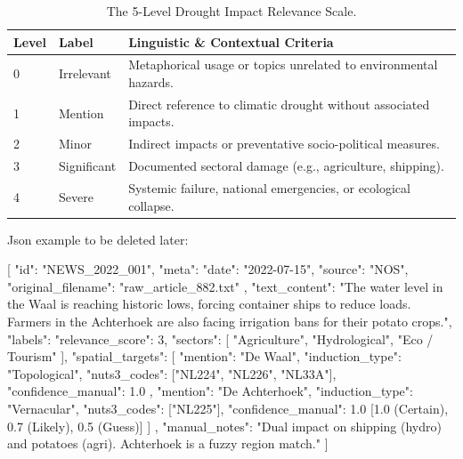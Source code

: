 \begin{table}[h!]
\centering
\begin{tabular}{|l|l|p{8.5cm}|}
\hline
\textbf{Level} & \textbf{Label} & \textbf{Linguistic \& Contextual Criteria} \\ \hline
0 & Irrelevant & Metaphorical usage or topics unrelated to environmental hazards. \\ \hline
1 & Mention & Direct reference to climatic drought without associated impacts. \\ \hline
2 & Minor & Indirect impacts or preventative socio-political measures. \\ \hline
3 & Significant & Documented sectoral damage (e.g., agriculture, shipping). \\ \hline
4 & Severe & Systemic failure, national emergencies, or ecological collapse. \\ \hline
\end{tabular}
\caption{The 5-Level Drought Impact Relevance Scale.}
\end{table}



Json example to be deleted later: 

[
  {
    "id": "NEWS_2022_001",
    "meta": {
      "date": "2022-07-15",
      "source": "NOS",
      "original_filename": "raw_article_882.txt"
    },
    "text_content": "The water level in the Waal is reaching historic lows, forcing container ships to reduce loads. Farmers in the Achterhoek are also facing irrigation bans for their potato crops.",
    "labels": {
      "relevance_score": 3,
      "sectors": [
        "Agriculture",
        "Hydrological",
        "Eco / Tourism"
      ],
      "spatial_targets": [
        {
          "mention": "De Waal",
          "induction_type": "Topological",
          "nuts3_codes": ["NL224", "NL226", "NL33A"],
          "confidence_manual": 1.0
        },
        {
          "mention": "De Achterhoek",
          "induction_type": "Vernacular",
          "nuts3_codes": ["NL225"],
          "confidence_manual": 1.0 [1.0 (Certain), 0.7 (Likely), 0.5 (Guess)]
        }
      ]
    },
    "manual_notes": "Dual impact on shipping (hydro) and potatoes (agri). Achterhoek is a fuzzy region match."
  }
]







